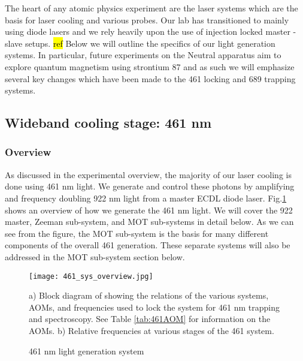 The heart of any atomic physics experiment are the laser systems which are the basis for laser cooling and various probes.
Our lab has transitioned to mainly using diode lasers and we rely heavily upon the use of injection locked master - slave setups. \hl{ref}
Below we will outline the specifics of our light generation systems.
In particular, future experiments on the Neutral apparatus aim to explore quantum magnetism using strontium 87 and as such we will emphasize several key changes which have been made to the 461 locking and 689 trapping systems.

\subsection{Wideband cooling stage: 461 nm}
\label{ssec:461sys}

\subsubsection{Overview}
As discussed in the experimental overview, the majority of our laser cooling is done using 461 nm light. We generate and control these photons by amplifying and frequency doubling 922 nm light from a master ECDL diode laser. 
Fig.\ref{fig:461blockSys} shows an overview of how we generate the 461 nm light. 
We will cover the 922 master, Zeeman sub-system, and MOT sub-systems in detail below.
As we can see from the figure, the MOT sub-system is the basis for many different components of the overall 461 generation.
These separate systems will also be addressed in the MOT sub-system section below.
	\begin{figure}
		\centerline{
		\texttt{[image: 461\_sys\_overview.jpg]}}
		\caption{461 nm light generation system}{a) Block diagram of showing the relations of the various systems, AOMs, and frequencies used to lock the system for 461 nm trapping and spectroscopy. See Table \ref{tab:461AOM} for information on the AOMs. b) Relative frequencies at various stages of the 461 system.}
		\label{fig:461blockSys}
	\end{figure} 

